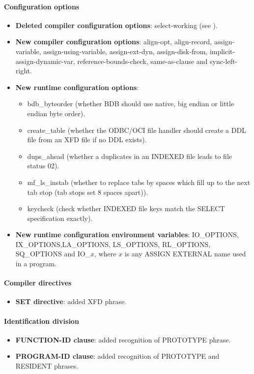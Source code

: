 \paragraph{Configuration options}
\begin{itemize}
\item \textbf{Deleted compiler configuration options}: select-working (see ).
\item \textbf{New compiler configuration options}: align-opt, align-record, assign-variable, assign-using-variable, assign-ext-dyn, assign-disk-from, implicit-assign-dynamic-var, reference-bounds-check, same-as-clause and sync-left-right.
\item \textbf{New runtime configuration options}:
  \begin{itemize}
  \item bdb\_byteorder (whether BDB should use native, big endian or little endian byte order).
  \item create\_table (whether the ODBC\slash{}OCI file handler should create a DDL file from an XFD file if no DDL exists).
  \item dups\_ahead (whether a duplicates in an INDEXED file leads to file status 02).
  \item mf\_ls\_instab (whether to replace tabs by spaces which fill up to the next tab stop (tab stops set 8 spaces apart)).
  \item keycheck (check whether INDEXED file keys match the SELECT specification exactly).
  \end{itemize}
\item \textbf{New runtime configuration environment variables}: IO\_OPTIONS, IX\_OPTIONS,\linebreak LA\_OPTIONS, LS\_OPTIONS, RL\_OPTIONS, SQ\_OPTIONS and IO\_$x$, where $x$ is any ASSIGN EXTERNAL name used in a program.
\end{itemize}

\paragraph{Compiler directives}
\begin{itemize}
\item \textbf{\directiveindicator{}SET directive}: added XFD phrase.
\end{itemize}

\paragraph{Identification division}
\begin{itemize}
\item \textbf{FUNCTION-ID clause}: added recognition of PROTOTYPE phrase.
\item \textbf{PROGRAM-ID clause}: added recognition of PROTOTYPE and RESIDENT phrases.
\end{itemize}

